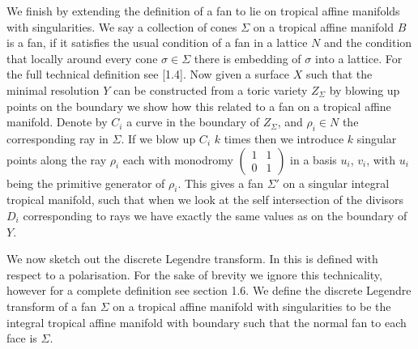 \documentclass[12pt,a4paper]{book}      %
\theoremstyle{definition}
\begin{document}
We finish by extending the definition of a fan to lie on tropical affine manifolds with singularities. We say a collection of cones $\Sigma$ on a tropical affine manifold $B$ is a fan, if it satisfies the usual condition of a fan in a lattice $N$ and the condition that locally around every cone $\sigma \in \Sigma$ there is embedding of $\sigma$ into a lattice. For the full technical definition see \cite{GrossBook}[1.4]. Now given a surface $X$ such that the minimal resolution $Y$ can be constructed from a toric variety $Z_\Sigma$ by blowing up points on the boundary we show how this related to a fan on a tropical affine manifold. Denote by $C_i$ a curve in the boundary of $Z_\Sigma$, and $\rho_i \in N$ the corresponding  ray in $\Sigma$. If we blow up $C_i$ $k$ times then we introduce $k$ singular points along the ray $\rho_i$ each with monodromy $\begin{pmatrix} 1 & 1 \\ 0 & 1 \end{pmatrix}$ in a basis $u_i$, $v_i$, with $u_i$ being the primitive generator of $\rho_i$. This gives a fan $\Sigma'$ on a singular integral tropical manifold, such that when we look at the self intersection of the divisors $D_i$ corresponding to rays we have exactly the same values as on the boundary of $Y$. %

We now sketch out the discrete Legendre transform. In \cite{GrossBook} this is defined with respect to a polarisation. For the sake of brevity we ignore this technicality, however for a complete definition see \cite{GrossBook} section 1.6. We define the discrete Legendre transform of a fan $\Sigma$ on a tropical affine manifold with singularities to be the integral tropical affine manifold with boundary such that the normal fan to each face is $\Sigma$.
\end{document}
